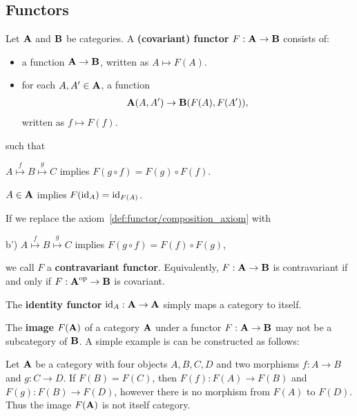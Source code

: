 \subsection{Functors}\label{sec:functors}

\begin{definition}\label{def:functor}\cite[definitions 1.2.1, 1.2.10]{Leinster2014}
  Let \( \operatorname{\mathbf{A}} \) and \( \operatorname{\mathbf{B}} \) be categories. A \textbf{(covariant) functor} \( F: \operatorname{\mathbf{A}} \to \operatorname{\mathbf{B}} \) consists of:
  \begin{itemize}
    \item a function \( \operatorname{\mathbf{A}} \to \operatorname{\mathbf{B}} \), written as \( A \mapsto F(A) \).
    \item for each \( A, A' \in \operatorname{\mathbf{A}} \), a function
    \begin{align*}
      \operatorname{\mathbf{A}}(A, A') \to \operatorname{\mathbf{B}}(F(A), F(A')),
    \end{align*}
    written as \( f \mapsto F(f) \).
  \end{itemize}
  such that
  \begin{defenum}
    \item\label{def:functor/composition_axiom} \( A \overset f \mapsto B \overset g \mapsto C \) implies \( F(g \circ f) = F(g) \circ F(f) \).
    \item\label{def:functor/identity_axiom} \( A \in \operatorname{\mathbf{A}} \) implies \( F(\operatorname{id}_A) = \operatorname{id}_{F(A)} \).
  \end{defenum}

  If we replace the axiom~\cref{def:functor/composition_axiom} with
  \begin{defenum}
    \item[b')]\label{def:functor/contravariant_composition_axiom} \( A \overset f \mapsto B \overset g \mapsto C \) implies \( F(g \circ f) = F(f) \circ F(g) \),
  \end{defenum}
  we call \( F \) a \textbf{contravariant functor}. Equivalently, \( F: \operatorname{\mathbf{A}} \to \operatorname{\mathbf{B}} \) is contravariant if and only if \( F: \operatorname{\mathbf{A}}^{\operatorname{op}} \to \operatorname{\mathbf{B}} \) is covariant.

  The \textbf{identity functor} \( \operatorname{id}_A: \operatorname{\mathbf{A}} \to \operatorname{\mathbf{A}} \) simply maps a category to itself.
\end{definition}

\begin{note}\label{note:image_of_functor_maybe_not_subcategory}
  The \textbf{image} \( F(\operatorname{\mathbf{A}}) \) of a category \( \operatorname{\mathbf{A}} \) under a functor \( F: \operatorname{\mathbf{A}} \to \operatorname{\mathbf{B}} \) may not be a subcategory of \( \operatorname{\mathbf{B}} \). A simple example is can be constructed as follows:

  Let \( \operatorname{\mathbf{A}} \) be a category with four objects \( A, B, C, D \) and two morphisms \( f: A \to B \) and \( g: C \to D \). If \( F(B) = F(C) \), then \( F(f): F(A) \to F(B) \) and \( F(g): F(B) \to F(D) \), however there is no morphism from \( F(A) \) to \( F(D) \). Thus the image \( F(\operatorname{\mathbf{A}}) \) is not itself category.
\end{note}

